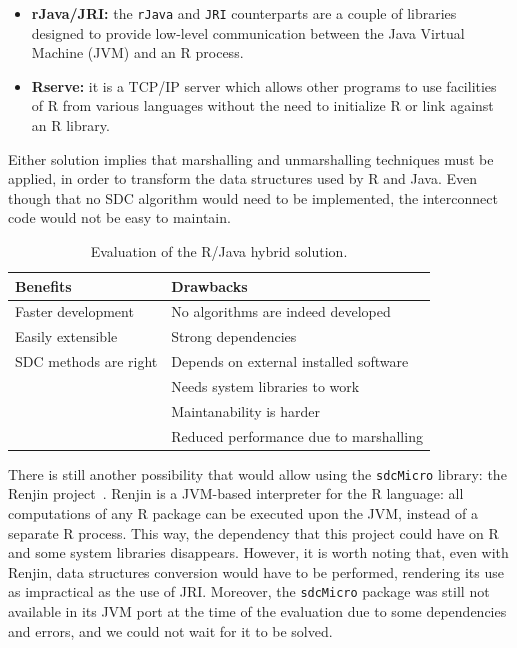 \begin{itemize}
	\item \textbf{rJava/JRI:} the \texttt{rJava} and \texttt{JRI} counterparts are a couple of libraries designed to provide low-level communication between the Java Virtual Machine (JVM) and an R process.
	\item \textbf{Rserve:} it is a TCP/IP server which allows other programs to use facilities of R from various languages without the need to initialize R or link against an R library.
\end{itemize}

Either solution implies that marshalling and unmarshalling techniques must be applied, in order to transform the data structures used by R and Java. Even though that no SDC algorithm would need to be implemented, the interconnect code would not be easy to maintain.

\begin{table}[h]
	\centering
	\begin{tabular}{ll}
		\hline
		\textbf{Benefits}     & \textbf{Drawbacks}                     \\ \hline
		Faster development    & No algorithms are indeed developed     \\
		Easily extensible     & Strong dependencies                    \\
		SDC methods are right & Depends on external installed software \\
		                      & Needs system libraries to work         \\
		                      & Maintanability is harder               \\
		                      & Reduced performance due to marshalling \\ \hline
	\end{tabular}
	\caption{Evaluation of the R/Java hybrid solution.}
	\label{table:JRI-pros-cons}
\end{table}

There is still another possibility that would allow using the \texttt{sdcMicro} library: the Renjin project~\cite{website:renjin}. Renjin is a JVM-based interpreter for the R language: all computations of any R package can be executed upon the JVM, instead of a separate R process. This way, the dependency that this project could have on R and some system libraries disappears. However, it is worth noting that, even with Renjin, data structures conversion would have to be performed, rendering its use as impractical as the use of JRI. Moreover, the \texttt{sdcMicro} package was still not available in its JVM port at the time of the evaluation due to some dependencies and errors, and we could not wait for it to be solved.

